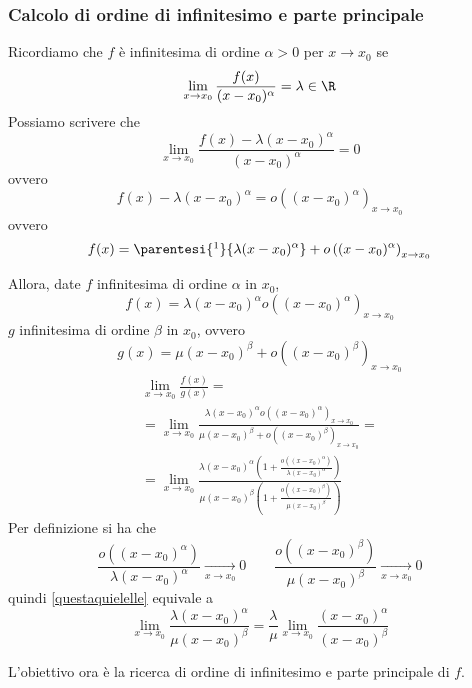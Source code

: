 \subsubsection{Calcolo di ordine di infinitesimo e parte principale}

Ricordiamo che $ f $ è infinitesima di ordine $ \alpha>0$ per $ x\to x_0 $ se \[
    \lim_{x\to x_0} \frac{f(x)}{(x-x_0)^{\alpha}} = \lambda \in \R 
\]
Possiamo scrivere che \[
    \lim_{x\to x_0} \frac{f(x)-\lambda (x-x_0)^\alpha}{(x- x_0 )^\alpha} =0
\] ovvero \[
    f(x)-\lambda (x-x_0)^\alpha = o((x- x_0 )^\alpha)_{x\to x_0}
\] ovvero \[
    f(x)= \parentesi{\footnotemark}{\lambda (x-x_0)^{\alpha}} + o \left((x-x_0)^{\alpha}\right)_{x\to x_0}
\]

Allora, date $ f $ infinitesima di ordine $ \alpha $ in $ x_0 $, 
\[
    f(x)= \lambda(x-x_0)^{\alpha} o \left((x-x_0)^{\alpha}\right)_{x\to x_0}
\]
$ g $ infinitesima di ordine $ \beta $ in $ x_0 $, ovvero \[
    g(x)= \mu(x-x_0)^{\beta}+ o\left((x-x_0)^{\beta}\right)_{x\to x_0}
\]
\begin{multline}
    \lim_{x\to x_0} \frac{f(x)}{g(x)} =\\
    = \lim_{x\to x_0} \frac{\lambda(x-x_0)^{\alpha} o \left((x-x_0)^{\alpha}\right)_{x\to x_0}}{\mu(x-x_0)^{\beta}+ o\left((x-x_0)^{\beta}\right)_{x\to x_0}}=\\
    = \lim_{x\to x_0} \frac{\lambda(x-x_0)^{\alpha}\left(1+\frac{o\left((x-x_0)^{\alpha}\right)}{\lambda(x-x_0)^{\alpha}}\right)}{\mu(x-x_0)^{\beta}\left(1+\frac{o\left((x-x_0)^{\beta}\right)}{\mu(x-x_0)^{\beta}}\right)}\label{questaquielelle}
\end{multline}
Per definizione si ha che \[
    \frac{o\left((x-x_0)^{\alpha}\right)}{\lambda(x-x_0)^{\alpha}} \xrightarrow[x\to x_0]{}  0 \qquad \frac{o\left((x-x_0)^{\beta}\right)}{\mu(x-x_0)^{\beta}} \xrightarrow[x\to x_0]{}  0
\] quindi \eqref{questaquielelle} equivale a
\begin{equation}
    \lim_{x\to x_0} \frac{\lambda(x-x_0)^{\alpha}}{\mu(x-x_0)^{\beta}}=\frac{\lambda}{\mu} \lim_{x\to x_0} \frac{(x-x_0)^{\alpha}}{(x-x_0)^{\beta}}
\end{equation}

L'obiettivo ora è la ricerca di ordine di infinitesimo e parte principale di $ f $.

